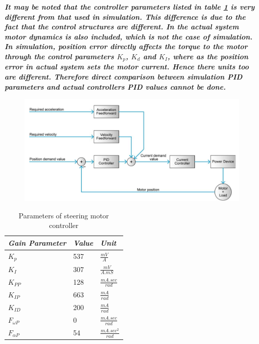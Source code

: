 \textbf{\textit{ It may be noted that the controller parameters listed in table \ref{tb:steer} is very different from that used in simulation. This difference is due to the fact that the control structures are different. In the actual system motor dynamics is also included, which is not the case  of simulation. In simulation,  position error directly affects the torque to the motor through the control parameters $K_p$, $K_d$ and $K_I$, where as the position error in actual system sets  the motor current. Hence there units too are different. Therefore direct comparison between simulation PID parameters and actual controllers PID values cannot be done.   }}
\begin{figure}
	\includegraphics[width=\linewidth,keepaspectratio]{Chapter5/fig/posLoop}
	\label{fig:posloop} 
\end{figure}
\begin{table}[!htbp]
	\caption{ Parameters of steering motor controller }
	\label{tb:steer}
	\centering
	\begin{tabular}{l l l}
		\hline
		\emph{Gain Parameter}  & \emph{ Value} & \emph{Unit} \\
		\hline
		$K_p$  & 537 &  $\frac{mV}{A}$ \\ 
		$K_I $ & 307 & $\frac{mV}{A.mS}$ \\
		$K_{PP}$& 128 & $ \frac{mA.sec}{rad}$\\
		$K_{IP}$&663&$\frac{mA}{rad}$\\
		$K_{ID}$&200&$\frac{mA}{rad}$\\
		$F_{\omega P}$& 0& $ \frac{mA.sec}{rad}$\\
		$F_{\alpha P}$& 54& $ \frac{mA.sec^2}{rad}$\\
		\hline
	\end{tabular}
\end{table}
